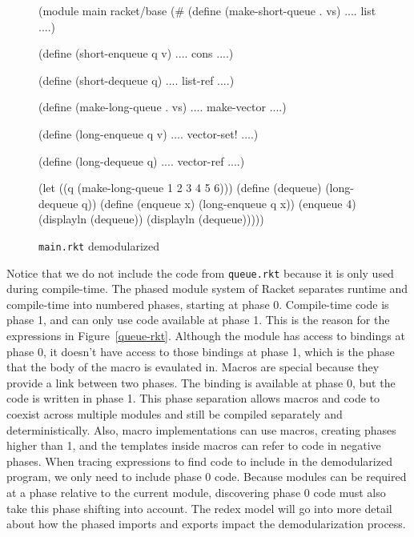 \documentclass[preprint]{sigplanconf}
\begin{document}
\begin{figure}[h]
\begin{schemedisplay}
(module main racket/base
  (#%
   (define (make-short-queue . vs)
    .... list ....)

   (define (short-enqueue q v)
    .... cons ....)

   (define (short-dequeue q)
    .... list-ref ....)

   (define (make-long-queue . vs)
    .... make-vector ....)

   (define (long-enqueue q v)
    .... vector-set! ....)

   (define (long-dequeue q)
    .... vector-ref ....)

   (let ((q (make-long-queue 1 2 3 4 5 6)))
     (define (dequeue) (long-dequeue q))
     (define (enqueue x) (long-enqueue q x))
     (enqueue 4)
     (displayln (dequeue))
     (displayln (dequeue)))))
\end{schemedisplay}
\caption{\texttt{main.rkt} demodularized}
\label{main-demod-rkt}
\end{figure}

Notice that we do not include the code from \texttt{queue.rkt} because it is only used during compile-time.
The phased module system of Racket separates runtime and compile-time into numbered phases, starting at phase 0.
Compile-time code is phase 1, and can only use code available at phase 1. 
This is the reason for the   expressions in Figure~\ref{queue-rkt}. 
Although the module has access to  bindings at phase 0, it doesn't have access to those bindings at phase 1, which is the phase that the body of the  macro is evaulated in.
Macros are special because they provide a link between two phases. 
The binding is available at phase 0, but the code is written in phase 1.
This phase separation allows macros and code to coexist across multiple modules and still be compiled separately and deterministically.
Also, macro implementations can use macros, creating phases higher than 1, and the templates inside macros can refer to code in negative phases.
When tracing  expressions to find code to include in the demodularized program, we only need to include phase 0 code.
Because modules can be required at a phase relative to the current module, discovering phase 0 code must also take this phase shifting into account.
The redex model will go into more detail about how the phased imports and exports impact the demodularization process.
\end{document}
